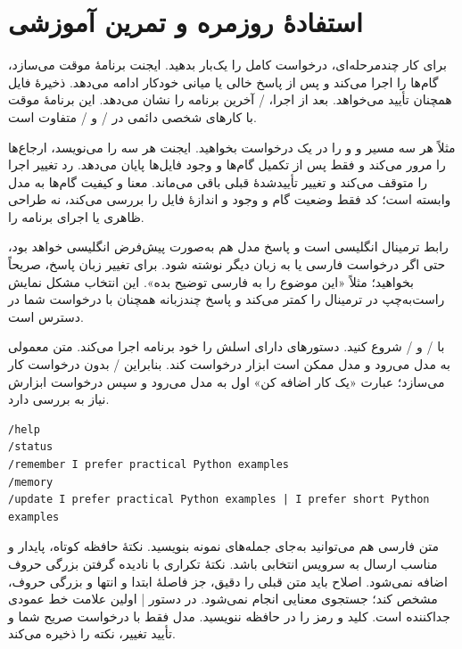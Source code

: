 \chapter{استفادهٔ روزمره و تمرین آموزشی}

برای کار چندمرحله‌ای، درخواست کامل را یک‌بار بدهید. ایجنت برنامهٔ موقت می‌سازد، گام‌ها را اجرا می‌کند و پس از پاسخ خالی یا میانی خودکار ادامه می‌دهد. ذخیرهٔ فایل همچنان تأیید می‌خواهد. بعد از اجرا، /
 آخرین برنامه را نشان می‌دهد. این برنامهٔ موقت با کارهای شخصی دائمی در /
 و /
 متفاوت است.

مثلاً هر سه مسیر 
 و 
 و 
 را در یک درخواست بخواهید. ایجنت هر سه را می‌نویسد، ارجاع‌ها را مرور می‌کند و فقط پس از تکمیل گام‌ها و وجود فایل‌ها پایان می‌دهد. رد تغییر اجرا را متوقف می‌کند و تغییر تأییدشدهٔ قبلی باقی می‌ماند. معنا و کیفیت گام‌ها به مدل وابسته است؛ کد فقط وضعیت گام و وجود و اندازهٔ فایل را بررسی می‌کند، نه طراحی ظاهری یا اجرای برنامه را.

رابط ترمینال انگلیسی است و پاسخ مدل هم به‌صورت پیش‌فرض انگلیسی خواهد بود، حتی اگر درخواست فارسی یا به زبان دیگر نوشته شود. برای تغییر زبان پاسخ، صریحاً بخواهید؛ مثلاً «این موضوع را به فارسی توضیح بده». این انتخاب مشکل نمایش راست‌به‌چپ در ترمینال را کمتر می‌کند و پاسخ چندزبانه همچنان با درخواست شما در دسترس است.

با /
 و /
 شروع کنید. دستورهای دارای اسلش را خود برنامه اجرا می‌کند. متن معمولی به مدل می‌رود و مدل ممکن است ابزار درخواست کند. بنابراین /
 بدون درخواست 
 کار می‌سازد؛ عبارت «یک کار اضافه کن» اول به مدل می‌رود و سپس درخواست ابزارش نیاز به بررسی دارد.

\begin{LTR}
\begin{Verbatim}[breaklines,breakanywhere,fontsize=\small]
/help
/status
/remember I prefer practical Python examples
/memory
/update I prefer practical Python examples | I prefer short Python examples
\end{Verbatim}
\end{LTR}

متن فارسی هم می‌توانید به‌جای جمله‌های نمونه بنویسید. نکتهٔ حافظه کوتاه، پایدار و مناسب ارسال به سرویس انتخابی باشد. نکتهٔ تکراری با نادیده گرفتن بزرگی حروف اضافه نمی‌شود. اصلاح باید متن قبلی را دقیق، جز فاصلهٔ ابتدا و انتها و بزرگی حروف، مشخص کند؛ جستجوی معنایی انجام نمی‌شود. در دستور 
 | 
 اولین علامت خط عمودی جداکننده است. کلید و رمز را در حافظه ننویسید. مدل فقط با درخواست صریح شما و تأیید تغییر، نکته را ذخیره می‌کند.

